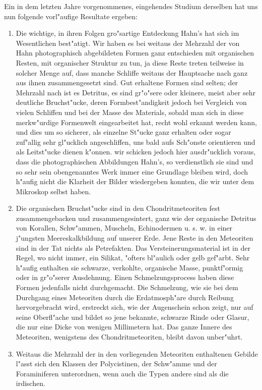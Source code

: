 \documentclass[a4paper, 11pt, oneside]{article}
\begin{document}
Ein in dem letzten Jahre vorgenommenes, eingehendes Studium derselben hat uns nun folgende vorl"aufige Resultate ergeben:
\begin{enumerate}
\item Die wichtige, in ihren Folgen gro"sartige Entdeckung Hahn's hat sich im Wesentlichen best"atigt. Wir haben es bei weitaus der Mehrzahl der von Hahn photographisch abgebildeten Formen ganz entschieden mit organischen Resten, mit organischer Struktur zu tun, ja diese Reste treten teilweise in solcher Menge auf, dass manche Schliffe weitaus der Hauptsache nach ganz aus ihnen zusammengesetzt sind. Gut erhaltene Formen sind selten; der Mehrzahl nach ist es Detritus, es sind gr"o"sere oder kleinere, meist aber sehr deutliche Bruchst"ucke, deren Formbest"andigkeit jedoch bei Vergleich von vielen Schliffen und bei der Masse des Materials, sobald man sich in diese merkw"urdige Formenwelt eingearbeitet hat, recht wohl erkannt werden kann, und dies um so sicherer, als einzelne St"ucke ganz erhalten oder sogar zuf"allig sehr gl"ucklich angeschliffen, uns bald aufs Sch"onste orientieren und als Leitst"ucke dienen k"onnen. wir schicken jedoch hier ausdr"ucklich voraus, dass die photographischen Abbildungen Hahn's, so verdienstlich sie sind und so sehr sein obengenanntes Werk immer eine Grundlage bleiben wird, doch h"aufig nicht die Klarheit der Bilder wiedergeben konnten, die wir unter dem Mikroskop selbst haben.
\item Die organischen Bruchst"ucke sind in den Chondritmeteoriten fest zusammengebacken und zusammengesintert, ganz wie der organische Detritus von Korallen, Schw"ammen, Muscheln, Echinodermen u. s. w. in einer j"ungsten Meereskalkbildung auf unserer Erde. Jene Reste in den Meteoriten sind in der Tat nichts als Petrefakten. Das Versteinerungsmaterial ist in der Regel, wo nicht immer, ein Silikat, "ofters bl"aulich oder gelb gef"arbt. Sehr h"aufig enthalten sie schwarze, verkohlte, organische Masse, punktf"ormig oder in gr"o"serer Ausdehnung. Einen Schmelzungsprocess haben diese Formen jedenfalls nicht durchgemacht. Die Schmelzung, wie sie bei dem Durchgang eines Meteoriten durch die Erdatmosph"are durch Reibung hervorgebracht wird, erstreckt sich, wie der Augenschein schon zeigt, nur auf seine Oberfl"ache und bildet so jene bekannte, schwarze Rinde oder Glasur, die nur eine Dicke von wenigen Millimetern hat. Das ganze Innere des Meteoriten, wenigstens des Chondritmeteoriten, bleibt davon unber"uhrt.
\item Weitaus die Mehrzahl der in den vorliegenden Meteoriten enthaltenen Gebilde l"asst sich den Klassen der Polycistinen, der Schw"amme und der Foraminiferen unterordnen, wenn auch die Typen andere sind als die irdischen.

\end{enumerate}
\end{document}
